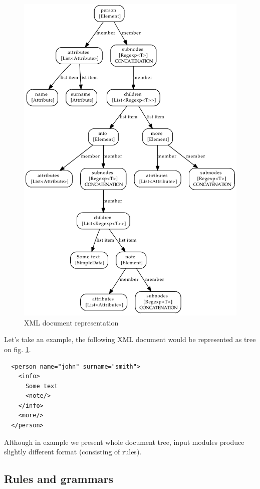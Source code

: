 \documentclass[a4paper,10pt,oneside]{article}
\newcommand{\myscale}{0.74}
\begin{document}
\begin{figure}
\centering\includegraphics[scale=\myscale]{xml_example}
\caption{XML document representation} \label{xml_example}
\end{figure}
Let's take an example, the following XML document would be represented as tree on fig. \ref{xml_example}.
\begin{verbatim}
  <person name="john" surname="smith">
    <info>
      Some text
      <note/>
    </info>
    <more/>
  </person>
\end{verbatim}
Although in example we present whole document tree, input modules produce slightly different format (consisting of rules).


\subsection{Rules and grammars}
\end{document}

